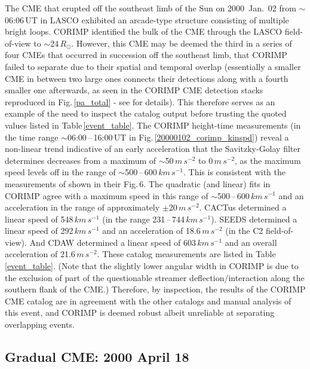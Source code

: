 \documentclass[referee,a4paper,12pt,traditabstract]{swsc}
\begin{document}
\begin{linenumbers}
The CME that erupted off the southeast limb of the Sun on 2000~Jan.~02 from $\sim$06:06\,UT in LASCO exhibited an arcade-type structure consisting of multiple bright loops. CORIMP identified the bulk of the CME through the LASCO field-of-view to $\sim$24\,$R_\odot$. However, this CME may be deemed the third in a series of four CMEs that occurred in succession off the southeast limb, that CORIMP failed to separate due to their spatial and temporal overlap (essentially a smaller CME in between two large ones connects their detections along with a fourth smaller one afterwards, as seen in the CORIMP CME detection stacks reproduced in Fig.\,\ref{pa_total} - see \citealt{2012ApJ...752..145B} for details). This therefore serves as an example of the need to inspect the catalog output before trusting the quoted values listed in Table\,\ref{event_table}. The CORIMP height-time measurements (in the time range $\sim$06:00\,--\,16:00\,UT in Fig.\,\ref{20000102_corimp_kinspd}) reveal a non-linear trend indicative of an early acceleration that the Savitzky-Golay filter determines decreases from a maximum of $\sim$50\,$m\,s^{-2}$ to 0\,$m\,s^{-2}$, as the maximum speed levels off in the range of $\sim$500\,--\,600\,$km\,s^{-1}$. This is consistent with the measurements of \cite{2009A&A...495..325B} shown in their Fig.\,6. The quadratic (and linear) fits in CORIMP agree with a maximum speed in this range of $\sim$500\,--\,600\,$km\,s^{-1}$ and an acceleration in the range of approximately $\pm$20\,$m\,s^{-2}$. CACTus determined a linear speed of 548\,$km\,s^{-1}$ (in the range 231\,--\,744\,$km\,s^{-1}$). SEEDS determined a linear speed of 292\,$km\,s^{-1}$ and an acceleration of 18.6\,$m\,s^{-2}$ (in the C2 field-of-view). And CDAW determined a linear speed of 603\,$km\,s^{-1}$ and an overall acceleration of 21.6\,$m\,s^{-2}$. These catalog measurements are listed in Table\,\ref{event_table}. (Note that the slightly lower angular width in CORIMP is due to the exclusion of part of the questionable streamer deflection/interaction along the southern flank of the CME.) Therefore, by inspection, the results of the CORIMP CME catalog are in agreement with the other catalogs and manual analysis of this event, and CORIMP is deemed robust albeit unreliable at separating overlapping events.


\subsection{Gradual CME: 2000 April 18}



\end{linenumbers}
\end{document}
